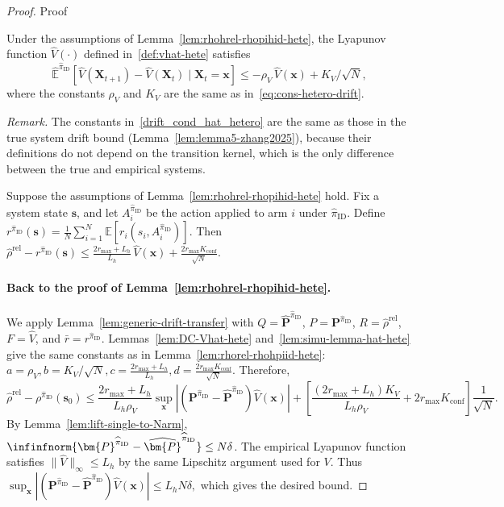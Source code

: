 \documentclass[mnsc,nonblindrev]{informs3}
\newcommand{\E}{\mathbb{E}}
\newcommand{\Vhat}{\widehat{V}}
\newcommand{\bp}{\bm{P}}
\newcommand{\bphat}{\widehat{\bm{P}}}
\newcommand{\pihid}{\widehat{\pi}_{\mathrm{ID}}}
\newcommand{\bms}{\bm{s}}
\newcommand{\bmx}{\bm{x}}
\newcommand{\rhohrel}{\widehat{\rho}^{\mathrm{rel}}}
\begin{document}
\begin{APPENDICES}
\begin{proof}{Proof}
\begin{lemma}\label{lem:DC-Vhat-hete}
    Under the assumptions of Lemma~\ref{lem:rhohrel-rhopihid-hete}, the Lyapunov function $\Vhat(\cdot)$ defined in~\eqref{def:vhat-hete} satisfies
    \begin{equation}\label{drift_cond_hat_hetero}
        \widehat{\E}^{\pihid}\!\left[\Vhat(\bm{X}_{t+1})-\Vhat(\bm{X}_t)\mid \bm{X}_t=\bmx\right]
        \le -\rho_V\,\Vhat(\bmx)+K_V/\sqrt{N},
    \end{equation}
    where the constants $\rho_V$ and $K_V$ are the same as in~\eqref{eq:cons-hetero-drift}.
\end{lemma}

\noindent
\emph{Remark.}
The constants in~\eqref{drift_cond_hat_hetero} are the same as those in the true system drift bound (Lemma~\ref{lem:lemma5-zhang2025}), because their definitions do not depend on the transition kernel, which is the only difference between the true and empirical systems.

\begin{lemma}\label{lem:simu-lemma-hat-hete}
    Suppose the assumptions of Lemma~\ref{lem:rhohrel-rhopihid-hete} hold. Fix a system state $\bms$, and let $A_i^{\pihid}$ be the action applied to arm $i$ under $\pihid$. Define
    $
    r^{\pihid}(\bms)=\frac{1}{N}\sum_{i=1}^N\E\!\left[r_i(s_i,A_i^{\pihid})\right].
    $
    Then
    $
        \rhohrel-r^{\pihid}(\bms)
        \le \frac{2r_{\max}+L_h}{L_h}\,\Vhat(\bmx)+\frac{2r_{\max}K_{\mathrm{conf}}}{\sqrt{N}}.
    $
\end{lemma}


\paragraph{Back to the proof of Lemma~\ref{lem:rhohrel-rhopihid-hete}.}
We apply Lemma~\ref{lem:generic-drift-transfer} with $Q=\bphat^{\pihid}$, $P=\bp^{\pihid}$, $R=\rhohrel$, $F=\Vhat$, and $\bar r=r^{\pihid}$. Lemmas~\ref{lem:DC-Vhat-hete} and~\ref{lem:simu-lemma-hat-hete} give the same constants as in Lemma~\ref{lem:rhorel-rhohpiid-hete}:
\(
    a=\rho_V,
    b=K_V/\sqrt N,
    c=\frac{2r_{\max}+L_h}{L_h},
    d=\frac{2r_{\max}K_{\mathrm{conf}}}{\sqrt N}.
\)
Therefore,
\[
    \rhohrel-\rho^{\pihid}(\bms_0)
    \le
    \frac{2r_{\max}+L_h}{L_h\rho_V}\sup_{\bmx}|(\bp^{\pihid}-\bphat^{\pihid})\Vhat(\bmx)|
    +\left[\frac{(2r_{\max}+L_h)K_V}{L_h\rho_V}+2r_{\max}K_{\mathrm{conf}}\right]\frac1{\sqrt N}.
\]
By Lemma~\ref{lem:lift-single-to-Narm}, $\infinfnorm{\bp^{\pihid}-\bphat^{\pihid}}\le N\delta$. The empirical Lyapunov function satisfies $\|\Vhat\|_\infty\le L_h$ by the same Lipschitz argument used for $V$. Thus
\(
    \sup_{\bmx}|(\bp^{\pihid}-\bphat^{\pihid})\Vhat(\bmx)|
    \le L_hN\delta,
\)
which gives the desired bound.
\end{proof}







\end{APPENDICES}
\end{document}
